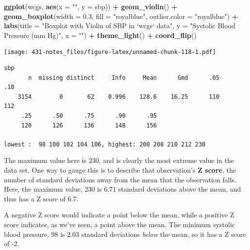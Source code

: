 \documentclass[
]{book}
\newenvironment{Shaded}{\begin{snugshade}}{\end{snugshade}}
\newcommand{\DataTypeTok}[1]{\textcolor[rgb]{0.13,0.29,0.53}{#1}}
\newcommand{\FloatTok}[1]{\textcolor[rgb]{0.00,0.00,0.81}{#1}}
\newcommand{\KeywordTok}[1]{\textcolor[rgb]{0.13,0.29,0.53}{\textbf{#1}}}
\newcommand{\NormalTok}[1]{#1}
\newcommand{\OperatorTok}[1]{\textcolor[rgb]{0.81,0.36,0.00}{\textbf{#1}}}
\newcommand{\StringTok}[1]{\textcolor[rgb]{0.31,0.60,0.02}{#1}}
\begin{document}
\begin{Shaded}
\begin{Highlighting}[]
\KeywordTok{ggplot}\NormalTok{(wcgs, }\KeywordTok{aes}\NormalTok{(}\DataTypeTok{x =} \StringTok{""}\NormalTok{, }\DataTypeTok{y =}\NormalTok{ sbp)) }\OperatorTok{+}
\StringTok{    }\KeywordTok{geom_violin}\NormalTok{() }\OperatorTok{+}
\StringTok{    }\KeywordTok{geom_boxplot}\NormalTok{(}\DataTypeTok{width =} \FloatTok{0.3}\NormalTok{, }\DataTypeTok{fill =} \StringTok{"royalblue"}\NormalTok{, }
                 \DataTypeTok{outlier.color =} \StringTok{"royalblue"}\NormalTok{) }\OperatorTok{+}
\StringTok{    }\KeywordTok{labs}\NormalTok{(}\DataTypeTok{title =} \StringTok{"Boxplot with Violin of SBP in `wcgs` data"}\NormalTok{,}
         \DataTypeTok{y =} \StringTok{"Systolic Blood Pressure (mm Hg)"}\NormalTok{, }
         \DataTypeTok{x =} \StringTok{""}\NormalTok{) }\OperatorTok{+}
\StringTok{    }\KeywordTok{theme_light}\NormalTok{() }\OperatorTok{+}
\StringTok{    }\KeywordTok{coord_flip}\NormalTok{() }
\end{Highlighting}
\end{Shaded}

\texttt{[image: 431-notes\_files/figure-latex/unnamed-chunk-118-1.pdf]}

\begin{Shaded}
\end{Shaded}

\begin{verbatim}
sbp 
       n  missing distinct     Info     Mean      Gmd      .05      .10 
    3154        0       62    0.996    128.6    16.25      110      112 
     .25      .50      .75      .90      .95 
     120      126      136      148      156 

lowest :  98 100 102 104 106, highest: 200 208 210 212 230
\end{verbatim}

The maximum value here is 230, and is clearly the most extreme value in the data set. One way to gauge this is to describe that observation's \textbf{Z score}, the number of standard deviations away from the mean that the observation falls. Here, the maximum value, 230 is 6.71 standard deviations above the mean, and thus has a Z score of 6.7.

A negative Z score would indicate a point below the mean, while a positive Z score indicates, as we've seen, a point above the mean. The minimum systolic blood pressure, 98 is 2.03 standard deviations \emph{below} the mean, so it has a Z score of -2.
\end{document}
